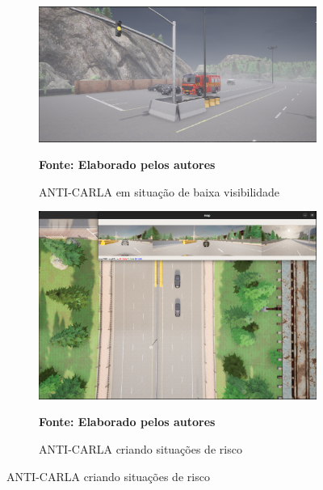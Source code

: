 \documentclass[a4paper,12pt,Times]{article}
\begin{document}
\begin{figure}[H]
\caption{Imagens ilustrativas do ANTI-CARLA}
\centering
\begin{subfigure}{0.45\textwidth}
    \centering
    \includegraphics[scale=0.13]{figuras/nevoa.png}
    \captionsetup{justification=centering}
    \caption{ANTI-CARLA em situação de baixa visibilidade}
    \label{fig:nevoa}
    \vspace{-0.2cm}
    \textbf{\footnotesize Fonte: Elaborado pelos autores}
\end{subfigure}
\hfill
\begin{subfigure}{0.45\textwidth}
    \centering
    \includegraphics[scale=0.13]{figuras/Anti-carla.png}
    \captionsetup{justification=centering}
    \caption{ANTI-CARLA criando situações de risco}
    \label{fig:anti-carla}
    \vspace{-0.2cm}
    \textbf{\footnotesize Fonte: Elaborado pelos autores}
\end{subfigure}

\end{figure}
\end{document}
